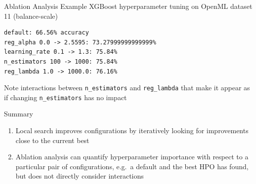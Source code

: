 \documentclass[main]{subfiles}
\begin{document}
\begin{frame}[fragile]{Ablation Analysis Example}
    XGBoost hyperparameter tuning on OpenML dataset 11 (balance-scale)
    \begin{verbatim}
default: 66.56% accuracy
reg_alpha 0.0 -> 2.5595: 73.27999999999999%
learning_rate 0.1 -> 1.3: 75.84%
n_estimators 100 -> 1000: 75.84%
reg_lambda 1.0 -> 1000.0: 76.16%
    \end{verbatim}
    Note interactions between \verb+n_estimators+ and \verb+reg_lambda+ that
    make it appear as if changing \verb+n_estimators+ has no impact
\end{frame}


\begin{frame}{Summary} 
\begin{enumerate}
    \item Local search improves configurations by iteratively looking for
        improvements close to the current best
    \item Ablation analysis can quantify hyperparameter importance with respect
        to a particular pair of configurations, e.g.\ a default and the best HPO
        has found, but does not directly consider interactions
\end{enumerate}
\end{frame}
\end{document}
